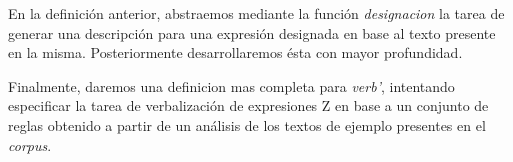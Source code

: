 En la definición anterior, abstraemos mediante la función \emph{designacion} la tarea de generar una descripción para una expresión designada en base al texto presente en la misma. Posteriormente desarrollaremos ésta con mayor profundidad. %

Finalmente, daremos una definicion mas completa para \emph{verb'}, intentando especificar la tarea de verbalización de expresiones Z en base a un conjunto de reglas obtenido a partir de un análisis de los textos de ejemplo presentes en el \emph{corpus}.

